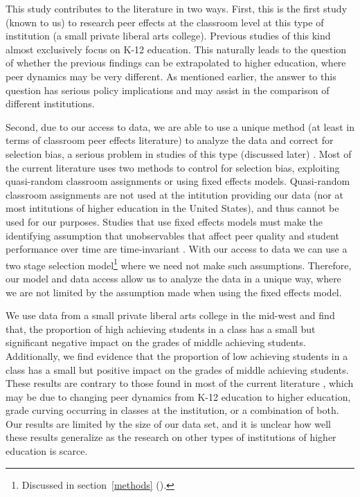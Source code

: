 \documentclass[12pt,letterpaper,english,fleqn]{article}
\newcommand{\sectlabel}[1]{section~\ref{#1} (\nameref{#1})}
\begin{document}
This study contributes to the literature in two ways.
First, this is the first study (known to us) to research peer effects at the classroom level at this type of institution (a small private liberal arts college). 
Previous studies of this kind  almost exclusively focus on K-12 education. 
This naturally leads to the question of whether the previous findings can be extrapolated to higher education, where peer dynamics may be very different. 
As mentioned earlier, the answer to this question has serious policy implications and may assist in the comparison of different institutions.

Second, due to our access to data, we are able to use a unique method (at least in terms of classroom peer effects literature) to analyze the data and correct for selection bias, a serious problem in studies of this type (discussed later) \citep{carman2012classroom,burke2013classroom,ding2007peers}. 
Most of the current literature uses two methods to control for selection bias, exploiting quasi-random classroom assignments or using fixed effects models.
Quasi-random classroom assignments are not used at the intitution providing our data (nor at most intitutions of higher education in the United States), and thus cannot be used for our purposes. 
Studies that use fixed effects models must make the identifying assumption that unobservables that affect peer quality and student performance over time are time-invariant \citep{lavy2012good}. 
With our access to data we can use a two stage selection model\footnote{Discussed in \sectlabel{methods}.} where we need not make such assumptions. 
Therefore, our model and data access allow us to analyze the data in a unique way, where we are not limited by the assumption made when using the fixed effects model.

We use data from a small private liberal arts college in the mid-west and find that, the proportion of high achieving students in a class has a small but significant negative impact on the grades of middle achieving students. 
Additionally, we find evidence that the proportion of low achieving students in a class has a small but positive impact on the grades of middle achieving students. 
These results are contrary to those found in most of the current literature \citep{kang2007classroom,carman2012classroom,burke2013classroom,schlosser2008inside,lavy2012good}, which may be due to changing peer dynamics from K-12 education to higher education, grade curving occurring in classes at the institution, or a combination of both.
Our results are limited by the size of our data set, and it is unclear how well these results generalize as the research on other types of institutions of higher education is scarce. 
\end{document}
